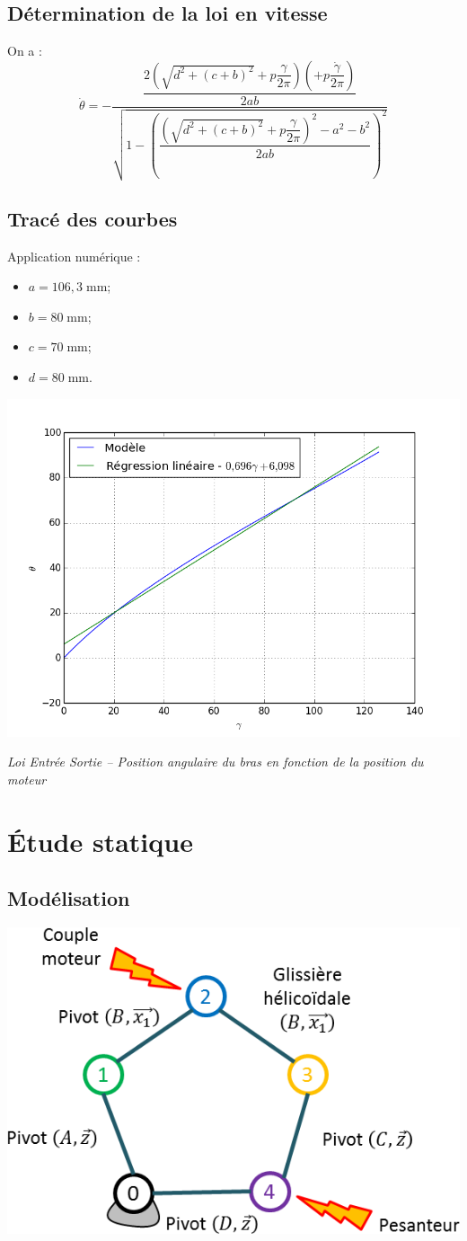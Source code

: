 \documentclass[10pt,fleqn]{article} %
\begin{document}
\subsection{Détermination de la loi en vitesse}

On a :
$$
\dot{\theta} = -\dfrac{\dfrac{2\left( \sqrt{d^2 + (c+b)^2} + p \dfrac{\gamma}{2\pi}\right) \left( + p \dfrac{\dot{\gamma}}{2\pi}\right)  }{2ab} }{\sqrt{1-\left(\dfrac{\left( \sqrt{d^2 + (c+b)^2} + p \dfrac{\gamma}{2\pi}\right)^2 - a^2 - b^2 }{2ab} \right)^2}}
$$

\subsection{Tracé des courbes} 
Application numérique : 
\begin{itemize}
\item $a = 106,3\; \text{mm}$;
\item $b = 80 \; \text{mm}$;
\item $c = 70 \; \text{mm}$;
\item $d = 80 \; \text{mm}$.
\end{itemize}

\begin{center}
\includegraphics[width=.45\textwidth]{images/LoiTheorique}

\textit{Loi Entrée Sortie -- Position angulaire du bras en fonction de la position du moteur} 
\end{center}
\section{Étude statique}
\subsection{Modélisation}
\begin{center}
\includegraphics[width=.45\textwidth]{images/graphe_structure}
\end{center}
\end{document}
